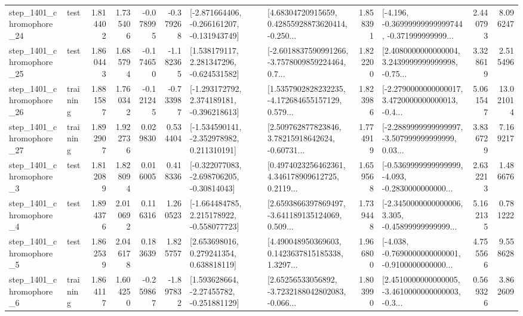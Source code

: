 \begin{tabular}{llrrrrllrlrr}
 step\_1401\_chromophore\_24 &      test &      1.814402 &    1.735406 &     -0.078995 & -0.379268 &  [-2.871664406, -0.266161207, -0.131943749] &  [4.68304720915659, 0.42855928873620414, -0.250... &       1.858391 &  [-4.196, -0.36999999999999744, -0.371999999999... &            2.440793 &          8.096247 \\
 step\_1401\_chromophore\_25 &      test &      1.860443 &    1.685794 &     -0.174650 & -1.182365 &    [1.538179117, 2.281347296, -0.624531582] &  [-2.6018837590991266, -3.7578009859224464, 0.7... &       1.822200 &  [2.4080000000000004, 3.2439999999999998, -0.75... &            3.328619 &          2.515496 \\
 step\_1401\_chromophore\_26 &  training &      1.881587 &    1.760342 &     -0.121245 & -0.733987 &   [-1.293172792, 2.374189181, -0.396218613] &  [1.5357902828232235, -4.172684655157129, 0.579... &       1.823986 &  [-2.2790000000000017, 3.4720000000000013, -0.4... &            5.061547 &         13.021014 \\
 step\_1401\_chromophore\_27 &  training &      1.892907 &    1.922736 &      0.029830 &  0.534404 &   [-1.534590141, -2.352978982, 0.211310191] &  [2.509762877823846, 3.78215918642624, -0.60731... &       1.774919 &  [-2.2889999999999997, -3.507999999999999, 0.03... &            3.836729 &          7.169217 \\
  step\_1401\_chromophore\_3 &      test &      1.812089 &    1.828094 &      0.016005 &  0.418336 &   [-0.322077083, -2.698706205, -0.30814043] &  [0.4974023256462361, 4.346178909612725, 0.2119... &       1.659568 &  [-0.5369999999999999, -4.093, -0.2830000000000... &            2.632213 &          1.486676 \\
  step\_1401\_chromophore\_4 &      test &      1.894376 &    2.010692 &      0.116316 &  1.260523 &   [-1.664484785, 2.215178922, -0.558077723] &  [2.6593866397869497, -3.641189135124069, 0.509... &       1.739448 &  [-2.3450000000000006, 3.305, -0.45899999999999... &            5.162135 &          0.781222 \\
  step\_1401\_chromophore\_5 &      test &      1.862539 &    2.046178 &      0.183639 &  1.825757 &     [2.653698016, 0.279241354, 0.638818119] &  [4.490048950369603, 0.1423637815185338, 1.3297... &       1.966800 &  [-4.038, -0.7690000000000001, -0.9100000000000... &            4.755566 &          9.558628 \\
  step\_1401\_chromophore\_6 &  training &      1.864117 &    1.604250 &     -0.259867 & -1.897832 &    [1.593628664, -2.27455782, -0.251881129] &  [2.65256533056892, -3.7232188042802083, -0.066... &       1.803990 &  [2.4510000000000005, -3.4610000000000003, -0.3... &            0.569326 &          3.862609 \\

\end{tabular}
